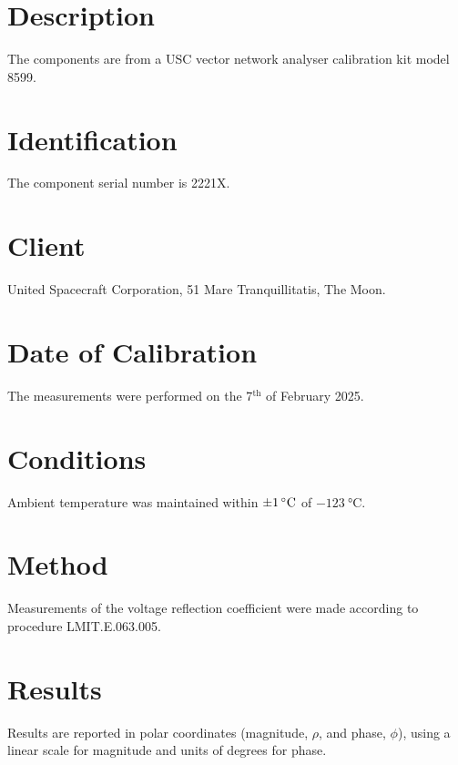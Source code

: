 \documentclass[11pt,a4paper]{article}
\date{\today}
\begin{document}
\pagestyle{fancyplain}
\raggedright        %
	
%
\section{Description}
The components are from a USC vector network analyser calibration kit model 8599. 

\section{Identification}
The component serial number is 2221X.

\section{Client}
United Spacecraft Corporation, 51 Mare Tranquillitatis, The Moon.

\section{Date of Calibration}
The measurements were performed on the 7$^\mathrm{th}$ of February 2025.

\section{Conditions}
Ambient temperature was maintained within $\SI{\pm 1}{\celsius}$ of $\SI{-123}{\celsius}$.

\section{Method}
Measurements of the voltage reflection coefficient were made according to procedure LMIT.E.063.005. 

\section{Results}
Results are reported in polar coordinates (magnitude, $\rho$, and phase, $\phi$), using a linear scale for magnitude and units of degrees for phase. 

\end{document}
